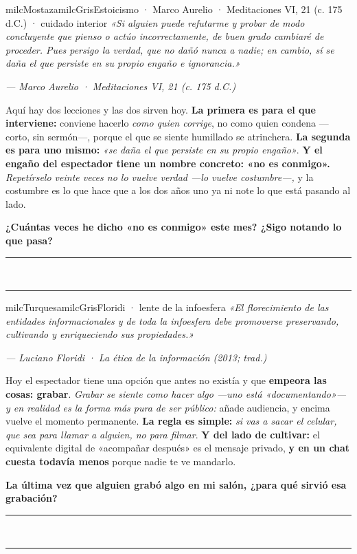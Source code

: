 \documentclass[11pt,letterpaper]{article}
\newcommand{\linead}[1]{\noindent\color{milcLinea}\rule{#1}{0.5pt}\color{milcNegro}}
\begin{document}
\begin{softbox}{milcMostaza}{milcGris}{Estoicismo · Marco Aurelio · Meditaciones VI, 21 (c. 175 d.C.) · cuidado interior}
\textit{«Si alguien puede refutarme y probar de modo concluyente que pienso o actúo incorrectamente, de buen grado cambiaré de proceder. Pues persigo la verdad, que no dañó nunca a nadie; en cambio, sí se daña el que persiste en su propio engaño e ignorancia.»}

{\footnotesize\itshape\color{milcNegro!70}--- Marco Aurelio · Meditaciones VI, 21 (c. 175 d.C.)}

Aquí hay dos lecciones y las dos sirven hoy. \textbf{La primera es para el que interviene:} conviene hacerlo \emph{como quien corrige}, no como quien condena ---corto, sin sermón---, porque el que se siente humillado se atrinchera. \textbf{La segunda es para uno mismo:} \emph{«se daña el que persiste en su propio engaño»}. \textbf{Y el engaño del espectador tiene un nombre concreto: «no es conmigo».} \emph{Repetírselo veinte veces no lo vuelve verdad ---lo vuelve costumbre---,} y la costumbre es lo que hace que a los dos años uno ya ni note lo que está pasando al lado.

\textbf{¿Cuántas veces he dicho «no es conmigo» este mes? ¿Sigo notando lo que pasa?}
\end{softbox}
\linead{\linewidth}\\[1mm]
\linead{\linewidth}

\begin{softbox}{milcTurquesa}{milcGris}{Floridi · lente de la infoesfera}
\textit{«El florecimiento de las entidades informacionales y de toda la infoesfera debe promoverse preservando, cultivando y enriqueciendo sus propiedades.»}

{\footnotesize\itshape\color{milcNegro!70}--- Luciano Floridi · La ética de la información (2013; trad.)}

Hoy el espectador tiene una opción que antes no existía y que \textbf{empeora las cosas: grabar}. \emph{Grabar se siente como hacer algo ---uno está «documentando»--- y en realidad es la forma más pura de ser público:} añade audiencia, y encima vuelve el momento permanente. \textbf{La regla es simple:} \emph{si vas a sacar el celular, que sea para llamar a alguien, no para filmar}. \textbf{Y del lado de cultivar:} el equivalente digital de «acompañar después» es el mensaje privado, \textbf{y en un chat cuesta todavía menos} porque nadie te ve mandarlo.

\textbf{La última vez que alguien grabó algo en mi salón, ¿para qué sirvió esa grabación?}
\end{softbox}
\linead{\linewidth}\\[1mm]
\linead{\linewidth}
\end{document}
